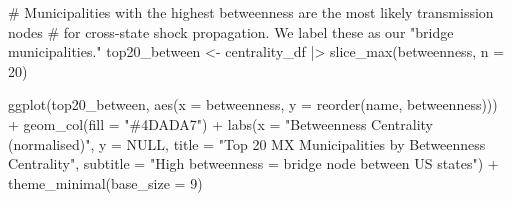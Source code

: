\documentclass[
  11pt,
  letterpaper,
  DIV=11,
  numbers=noendperiod]{scrartcl}
\newenvironment{Shaded}{}{}
\newcommand{\AttributeTok}[1]{\textcolor[rgb]{0.84,0.23,0.29}{#1}}
\newcommand{\CommentTok}[1]{\textcolor[rgb]{0.42,0.45,0.49}{#1}}
\newcommand{\ConstantTok}[1]{\textcolor[rgb]{0.00,0.36,0.77}{#1}}
\newcommand{\DecValTok}[1]{\textcolor[rgb]{0.00,0.36,0.77}{#1}}
\newcommand{\FunctionTok}[1]{\textcolor[rgb]{0.44,0.26,0.76}{#1}}
\newcommand{\NormalTok}[1]{\textcolor[rgb]{0.14,0.16,0.18}{#1}}
\newcommand{\OtherTok}[1]{\textcolor[rgb]{0.44,0.26,0.76}{#1}}
\newcommand{\SpecialCharTok}[1]{\textcolor[rgb]{0.00,0.36,0.77}{#1}}
\newcommand{\StringTok}[1]{\textcolor[rgb]{0.01,0.18,0.38}{#1}}
\begin{document}
\begin{Shaded}
\begin{Highlighting}[]
\CommentTok{\# Municipalities with the highest betweenness are the most likely transmission nodes}
\CommentTok{\# for cross{-}state shock propagation. We label these as our "bridge municipalities."}
\NormalTok{top20\_between }\OtherTok{\textless{}{-}}\NormalTok{ centrality\_df }\SpecialCharTok{|\textgreater{}} \FunctionTok{slice\_max}\NormalTok{(betweenness, }\AttributeTok{n =} \DecValTok{20}\NormalTok{)}

\FunctionTok{ggplot}\NormalTok{(top20\_between,}
       \FunctionTok{aes}\NormalTok{(}\AttributeTok{x =}\NormalTok{ betweenness, }\AttributeTok{y =} \FunctionTok{reorder}\NormalTok{(name, betweenness))) }\SpecialCharTok{+}
  \FunctionTok{geom\_col}\NormalTok{(}\AttributeTok{fill =} \StringTok{"\#4DADA7"}\NormalTok{) }\SpecialCharTok{+}
  \FunctionTok{labs}\NormalTok{(}\AttributeTok{x =} \StringTok{"Betweenness Centrality (normalised)"}\NormalTok{,}
       \AttributeTok{y =} \ConstantTok{NULL}\NormalTok{,}
       \AttributeTok{title =} \StringTok{"Top 20 MX Municipalities by Betweenness Centrality"}\NormalTok{,}
       \AttributeTok{subtitle =} \StringTok{"High betweenness = bridge node between US states"}\NormalTok{) }\SpecialCharTok{+}
  \FunctionTok{theme\_minimal}\NormalTok{(}\AttributeTok{base\_size =} \DecValTok{9}\NormalTok{)}
\end{Highlighting}
\end{Shaded}
\end{document}
